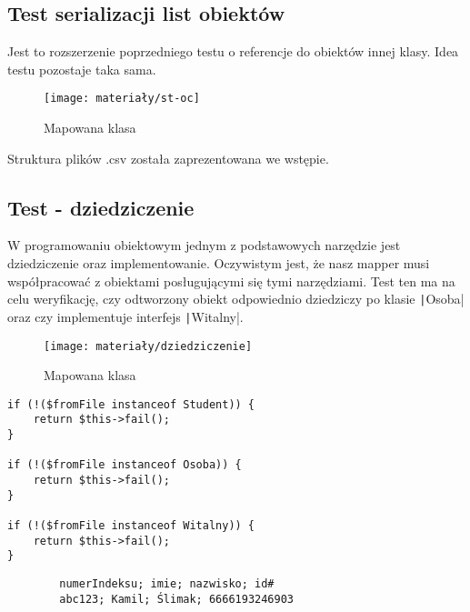 \subsection{Test serializacji list obiektów}
Jest to rozszerzenie poprzedniego testu o referencje do obiektów innej klasy. Idea testu pozostaje taka sama.

\begin{figure}[ht]
	\centering
	\texttt{[image: materiały/st-oc]}
	\caption{Mapowana klasa}
\end{figure}

Struktura plików .csv została zaprezentowana we wstępie. 


\subsection{Test - dziedziczenie}
W programowaniu obiektowym jednym z podstawowych narzędzie jest dziedziczenie oraz implementowanie. Oczywistym jest, że nasz mapper musi współpracować z obiektami posługującymi się tymi narzędziami. Test ten ma na celu weryfikację, czy odtworzony obiekt odpowiednio dziedziczy po klasie \texttt|Osoba| oraz czy implementuje interfejs \texttt|Witalny|.

\begin{figure}[ht]
	\centering
	\texttt{[image: materiały/dziedziczenie]}
	\caption{Mapowana klasa}
\end{figure}

\begin{empty}
	\begin{verbatim}
if (!($fromFile instanceof Student)) {
	return $this->fail();
}

if (!($fromFile instanceof Osoba)) {
	return $this->fail();
}

if (!($fromFile instanceof Witalny)) {
	return $this->fail();
}
	\end{verbatim}
	\vspace{-10pt}
\end{empty}

\begin{empty}
	\begin{verbatim}
		numerIndeksu; imie; nazwisko; id#
		abc123; Kamil; Ślimak; 6666193246903
	\end{verbatim}
	\vspace{-10pt}
\end{empty}


